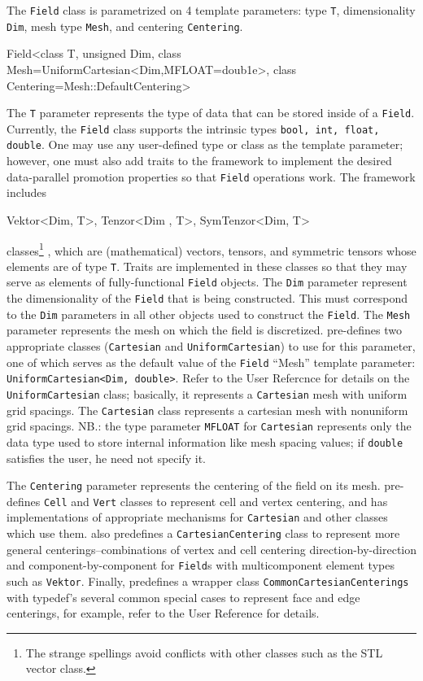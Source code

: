 The \texttt{Field} class is parametrized on 4 template parameters: type \texttt{T}, dimensionality \texttt{Dim},
mesh type \texttt{Mesh}, and centering \texttt{Centering}.
\begin{smallcode}
Field<class T, unsigned Dim, class Mesh=UniformCartesian<Dim,MFLOAT=doub1e>,
      class Centering=Mesh::DefaultCentering>
\end{smallcode}
The \texttt{T} parameter represents the type of data that can be stored inside of a \texttt{Field}. Currently,
the \texttt{Field} class supports the intrinsic types \texttt{bool, int, float, double}. One may use any
user-defined type or class as the template parameter; however, one must also add traits to the
framework to implement the desired data-parallel promotion properties so that \texttt{Field} operations
work. The framework includes
\begin{smallcode}
Vektor<Dim, T>, Tenzor<Dim , T>, SymTenzor<Dim, T>
\end{smallcode}
classes\footnote{The strange spellings avoid conflicts with other classes such as the STL vector class.}
, which are (mathematical) vectors, tensors, and symmetric tensors whose
elements are of type \texttt{T}. Traits are implemented in these classes so that they may serve as elements
of fully-functional \texttt{Field} objects.
The \texttt{Dim} parameter represent the dimensionality of the \texttt{Field} that is being constructed. This
must correspond to the \texttt{Dim} parameters in all other objects used to construct the \texttt{Field}.
The \texttt{Mesh} parameter represents the mesh on which the field is discretized. \ippl
pre-defines two appropriate classes (\texttt{Cartesian} and \texttt{UniformCartesian}) to use for this
parameter, one of which serves as the default value of the \texttt{Field} ``Mesh'' template parameter:
\texttt{UniformCartesian<Dim, double>}. Refer to the \ippl User Refercnce for details on the
\texttt{UniformCartesian} class; basically, it represents a \texttt{Cartesian} mesh with uniform grid spacings.
The \texttt{Cartesian} class represents a cartesian mesh with nonuniform grid spacings. NB.:
the type parameter \texttt{MFLOAT} for \texttt{Cartesian} represents only the data type used to store internal
information like mesh spacing values; if \texttt{double} satisfies the user, he need not specify it.

The \texttt{Centering} parameter represents the centering of the field on its mesh. \ippl
pre-defines \texttt{Cell} and \texttt{Vert} classes to represent cell and vertex centering, and has implementations
of appropriate mechanisms for \texttt{Cartesian} and other classes which use them. \ippl
also predefines a \texttt{CartesianCentering} class to represent more general centerings--combinations
of vertex and cell centering direction-by-direction and component-by-component for
\texttt{Field}s with multicomponent element types such as \texttt{Vektor}. Finally, \ippl predefines a
wrapper class \texttt{CommonCartesianCenterings} with typedef’s several common special
cases to represent face and edge centerings, for example, refer to the \ippl User Reference
for details.

